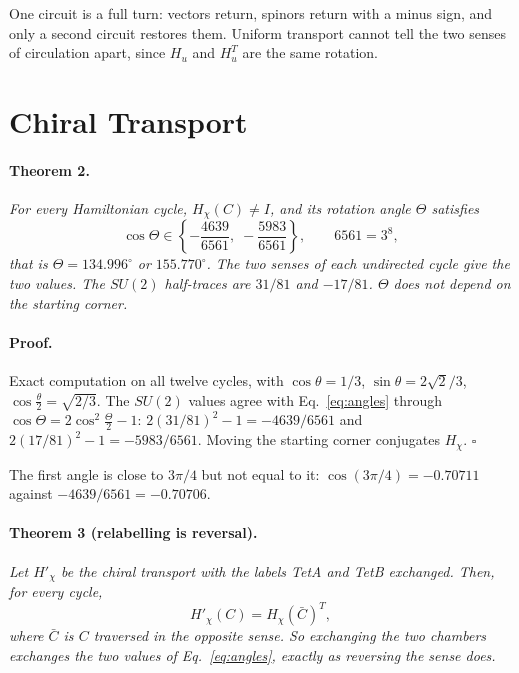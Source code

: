 \documentclass[twocolumn]{iopjournal}
\begin{document}
\medskip
\noindent
One circuit is a full turn: vectors return, spinors return with a
minus sign, and only a second circuit restores them. Uniform
transport cannot tell the two senses of circulation apart, since
$H_u$ and $H_u^T$ are the same rotation.


\section*{Chiral Transport}

\paragraph{Theorem 2.} \textit{For every Hamiltonian cycle,
$H_\chi(C) \neq I$, and its rotation angle $\Theta$ satisfies}
\begin{equation}
  \cos\Theta \in \left\{-\frac{4639}{6561},\;
  -\frac{5983}{6561}\right\}, \qquad 6561 = 3^8 ,
  \label{eq:angles}
\end{equation}
\textit{that is $\Theta = 134.996^\circ$ or $155.770^\circ$. The two
senses of each undirected cycle give the two values. The $SU(2)$
half-traces are $31/81$ and $-17/81$. $\Theta$ does not depend on the
starting corner.}

\paragraph{Proof.} Exact computation on all twelve cycles, with
$\cos\theta = 1/3$, $\sin\theta = 2\sqrt2/3$, $\cos\tfrac\theta2 =
\sqrt{2/3}$. The $SU(2)$ values agree with Eq.~\eqref{eq:angles}
through $\cos\Theta = 2\cos^2\tfrac\Theta2 - 1$:
$2(31/81)^2 - 1 = -4639/6561$ and $2(17/81)^2 - 1 = -5983/6561$.
Moving the starting corner conjugates $H_\chi$. \hfill $\square$

\medskip
\noindent
The first angle is close to $3\pi/4$ but not equal to it:
$\cos(3\pi/4) = -0.70711$ against $-4639/6561 = -0.70706$.

\paragraph{Theorem 3 (relabelling is reversal).} \textit{Let
$H'_\chi$ be the chiral transport with the labels TetA and TetB
exchanged. Then, for every cycle,}
\begin{equation}
  H'_\chi(C) = H_\chi(\bar C)^T ,
  \label{eq:relabel}
\end{equation}
\textit{where $\bar C$ is $C$ traversed in the opposite sense. So
exchanging the two chambers exchanges the two values of
Eq.~\eqref{eq:angles}, exactly as reversing the sense does.}
\end{document}
